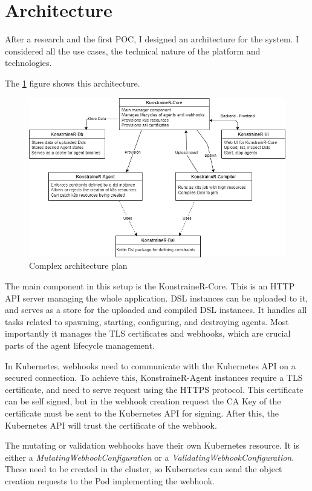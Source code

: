 \section{Architecture}

After a research and the first POC, I designed an architecture for the system. I considered all the use cases, the technical nature of the platform and technologies.

The \ref{fig:comp_arch} figure shows this architecture.

\begin{figure}[h]
    \centering
    \includegraphics[width=130mm, keepaspectratio]{content/75_implementation/xarch.png}
    \caption{Complex architecture plan}
    \label{fig:comp_arch}
\end{figure}


The main component in this setup is the KonstraineR-Core. This is an HTTP API server managing the whole application. DSL instances can be uploaded to it, and serves as a store for the uploaded and compiled DSL instances. It handles all tasks related to spawning, starting, configuring, and destroying agents. Most importantly it manages the TLS certificates and webhooks, which are crucial parts of the agent lifecycle management.

In Kubernetes, webhooks need to communicate with the Kubernetes API on a secured connection. To achieve this, KonstraineR-Agent instances require a TLS certificate, and need to serve request using the HTTPS protocol. This certificate can be self signed, but in the webhook creation request the CA Key of the certificate must be sent to the Kubernetes API for signing. After this, the Kubernetes API will trust the certificate of the webhook.

The mutating or validation webhooks have their own Kubernetes resource. It is either a \emph{MutatingWebhookConfiguration} or a \emph{ValidatingWebhookConfiguration}. These need to be created in the cluster, so Kubernetes can send the object creation requests to the Pod implementing the webhook.

